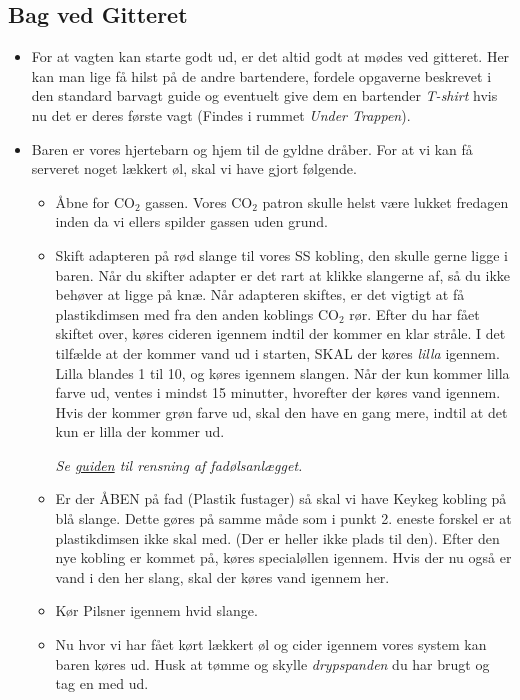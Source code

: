\subsection{Bag ved Gitteret}
\label{sec:pre:bag-ved-gitteret}
\begin{itemize}
    \item For at vagten kan starte godt ud, er det altid godt at mødes ved gitteret.
    Her kan man lige få hilst på de andre bartendere, fordele opgaverne beskrevet i den standard
    barvagt guide og eventuelt give dem en bartender \textit{T-shirt} hvis nu det er deres første vagt
    (Findes i rummet \textit{Under Trappen}).
    \item Baren er vores hjertebarn og hjem til de gyldne dråber.
    For at vi kan få serveret noget lækkert øl, skal vi have gjort følgende.
    \begin{itemize}
        \item Åbne for CO$_2$ gassen. Vores CO$_2$ patron skulle helst være lukket fredagen
        inden da vi ellers spilder gassen uden grund.
        \item Skift adapteren på rød slange til vores SS kobling, den skulle gerne ligge i baren.
        Når du skifter adapter er det rart at klikke slangerne af, så du ikke behøver at ligge på knæ.
        Når adapteren skiftes, er det vigtigt at få plastikdimsen med fra den anden koblings CO$_2$ rør.
        Efter du har fået skiftet over, køres cideren igennem indtil der kommer en klar stråle.
        I det tilfælde at der kommer vand ud i starten, SKAL der køres \textit{lilla} igennem.
        Lilla blandes 1 til 10, og køres igennem slangen. Når der kun kommer lilla farve ud, ventes i
        mindst 15 minutter, hvorefter der køres vand igennem. Hvis der kommer grøn farve ud, skal den
        have en gang mere, indtil at det kun er lilla der kommer ud.
        
        \textit{Se \href{https://media.fredagscafeen.dk/guides/rensningafanlaeg.pdf}{guiden} til rensning af fadølsanlægget.}
        \item Er der ÅBEN på fad (Plastik fustager) så skal vi have Keykeg kobling på blå slange.
        Dette gøres på samme måde som i punkt 2. eneste forskel er at plastikdimsen ikke skal med.
        (Der er heller ikke plads til den).
        Efter den nye kobling er kommet på, køres specialøllen igennem.
        Hvis der nu også er vand i den her slang, skal der køres vand igennem her.
        \item Kør Pilsner igennem hvid slange.
        \item Nu hvor vi har fået kørt lækkert øl og cider igennem vores system kan baren køres ud.
        Husk at tømme og skylle \textit{drypspanden} du har brugt og tag en med ud.
    \end{itemize}
\end{itemize}


